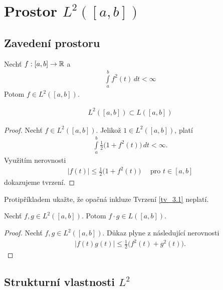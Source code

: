 

\chapter{Prostor \texorpdfstring{$L^2([a,b])$}{L2}}


\section{Zavedení prostoru}


\begin{definition}[$L^2$ prostor]
Nechť $f:[a,b] \to \mathbb{R}$ a
\begin{align*}
\int \limits_a^b f^2(t) \, dt<\infty
\end{align*} 
Potom $f \in L^2([a,b])$.
\end{definition}


\begin{tvrz}
\label{tv_3.1}
\begin{align*}
L^2([a,b]) \subset L([a,b])
\end{align*}
\end{tvrz}
\begin{proof}
Nechť $f \in L^2([a,b])$. Jelikož $1 \in L^2([a,b])$, platí
\begin{align*}
\int \limits _{a}^b \frac{1}{2} \Big(1 + f^2(t)\Big) \, dt< \infty.
\end{align*}
Využitím nerovnosti 
\begin{align*}
|f(t)| \leq \frac{1}{2} \Big(1 + f^2(t)\Big) \quad \textrm{ pro } t \in [a,b]
\end{align*}
dokazujeme tvrzení.
\end{proof}
\begin{uloha}
Protipříkladem ukažte, že opačná inkluze Tvrzení \ref{tv_3.1} neplatí.
\end{uloha}


\begin{tvrz}
\label{tv_3.2}
Nechť $f,g \in L^2([a,b])$. Potom $f \cdot g \in L([a,b])$.
\end{tvrz}
\begin{proof}
Nechť $f,g \in L^2([a,b])$. Důkaz plyne z následující nerovnosti
\begin{align*}
|f(t) g(t)| \leq \frac{1}{2}\Big(f^2(t) + g^2(t)\Big).
\end{align*}
\end{proof}


\section{Strukturní vlastnosti \texorpdfstring{$L^2$}{L2}}

